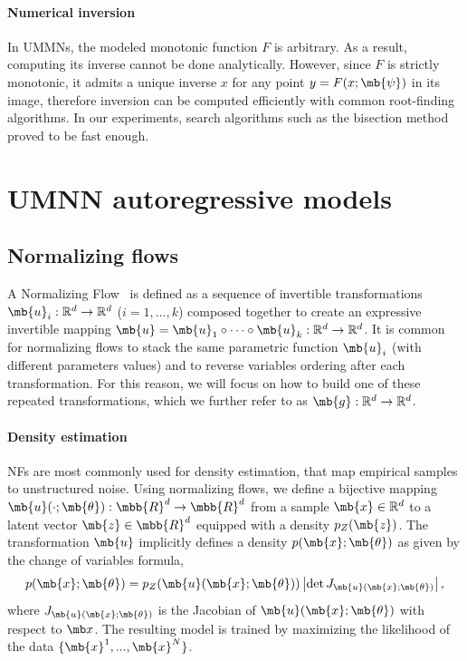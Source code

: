 \paragraph{Numerical inversion}
In UMMNs, the modeled monotonic function $F$ is arbitrary.
As a result, computing its inverse cannot be done analytically.
However, since $F$ is strictly monotonic, it admits a unique inverse $x$ for any point $y=F(x;\mb{\psi})$ in its image, therefore inversion can be computed efficiently with common root-finding algorithms.
In our experiments, search algorithms such as the bisection method proved to be fast enough.



\section{UMNN autoregressive models}

\subsection{Normalizing flows}

A Normalizing Flow~\citep[NF, ][]{NF} is defined as a sequence of invertible transformations $\mb{u}_i : \mathbb{R}^d \to \mathbb{R}^d$  ($i=1, ..., k$) composed together to create an expressive invertible mapping $\mb{u} = \mb{u}_1 \circ \dots \circ \mb{u}_k : \mathbb{R}^d \to \mathbb{R}^d$.
It is common for normalizing flows to stack the same parametric function $\mb{u}_i$ (with different parameters values) and to reverse variables ordering after each transformation. For this reason, we will focus on how to build one of these repeated transformations, which we further refer to as $\mb{g}: \mathbb{R}^d\rightarrow \mathbb{R}^d$.

\paragraph{Density estimation}
NFs are most commonly used for density estimation, that map empirical samples to unstructured noise.
Using normalizing flows, we define  a bijective mapping $\mb{u}(\cdot ;\mb{\theta}): \mbb{R}^d \rightarrow \mbb{R}^d$ from a sample $\mb{x} \in \mathbb{R}^d$ to a latent vector $\mb{z} \in \mbb{R}^d$ equipped with a density $p_Z(\mb{z})$.
The transformation $\mb{u}$ implicitly defines a density $p(\mb{x}; \mb{\theta})$ as given by the change of variables formula,
\begin{equation}
    p(\mb{x}; \mb{\theta}) = p_Z(\mb{u}(\mb{x};\mb{\theta})) \left| \det  J_{\mb{u}(\mb{x};\mb{\theta})} \right|, \label{eq:NF_DE}
\end{equation}
where $J_{\mb{u}(\mb{x};\mb{\theta})}$ is the Jacobian of $\mb{u}(\mb{x};\mb{\theta})$ with respect to $\mb x$.
The resulting model is trained by maximizing the likelihood of the data $\{\mb{x}^1, ..., \mb{x}^N\}$.

